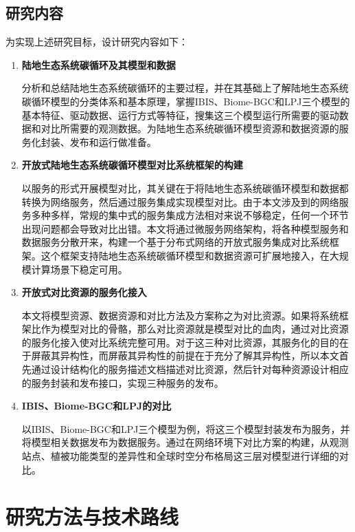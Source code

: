 \subsection{研究内容}
为实现上述研究目标，设计研究内容如下：
\begin{enumerate}[(1)]
\item \textbf{陆地生态系统碳循环及其模型和数据}

分析和总结陆地生态系统碳循环的主要过程，并在其基础上了解陆地生态系统碳循环模型的分类体系和基本原理，掌握IBIS、Biome-BGC和LPJ三个模型的基本特征、驱动数据、运行方式等特征，搜集这三个模型运行所需要的驱动数据和对比所需要的观测数据。为陆地生态系统碳循环模型资源和数据资源的服务化封装、发布和运行做准备。

\item \textbf{开放式陆地生态系统碳循环模型对比系统框架的构建}

以服务的形式开展模型对比，其关键在于将陆地生态系统碳循环模型和数据都转换为网络服务，然后通过服务集成实现模型对比。由于本文涉及到的网络服务多种多样，常规的集中式的服务集成方法相对来说不够稳定，任何一个环节出现问题都会导致对比出错。本文将通过微服务网络架构，将各种模型服务和数据服务分散开来，构建一个基于分布式网络的开放式服务集成对比系统框架。这个框架支持陆地生态系统碳循环模型和数据资源可扩展地接入，在大规模计算场景下稳定可用。

\item \textbf{开放式对比资源的服务化接入}

本文将模型资源、数据资源和对比方法及方案称之为对比资源。如果将系统框架比作为模型对比的骨骼，那么对比资源就是模型对比的血肉，通过对比资源的服务化接入使对比系统完整可用。对于这三种对比资源，其服务化的目的在于屏蔽其异构性，而屏蔽其异构性的前提在于充分了解其异构性，所以本文首先通过设计结构化的服务描述文档描述对比资源，然后针对每种资源设计相应的服务封装和发布接口，实现三种服务的发布。

\item \textbf{IBIS、Biome-BGC和LPJ的对比}

以IBIS、Biome-BGC和LPJ三个模型为例，将这三个模型封装发布为服务，并将模型相关数据发布为数据服务。通过在网络环境下对比方案的构建，从观测站点、植被功能类型的差异性和全球时空分布格局这三层对模型进行详细的对比。
\end{enumerate}


\section{研究方法与技术路线}
